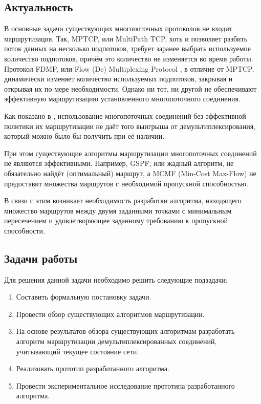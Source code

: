 \documentclass[a4paper]{article}
\begin{document}
\subsection{Актуальность}
В основные задачи существующих многопоточных протоколов не входит маршрутизация. Так, MPTCP, или MultiPath TCP, хоть и позволяет разбить поток данных на несколько подпотоков, требует заранее выбрать используемое количество подпотоков, причём это количество не изменяется во время работы. Протокол FDMP, или Flow (De) Multiplexing Protocol \cite{FDMP}, в отличие от MPTCP, динамически изменяет количество используемых подпотоков, закрывая и открывая их по мере необходимости. Однако ни тот, ни другой не обеспечивают эффективную маршрутизацию установленного многопоточного соединения. 

Как показано в \cite{stepsmel}, использование многопоточных соединений без эффективной политики их маршрутизации не даёт того выигрыша от демультиплексирования, который можно было бы получить при её наличии. 

При этом существующие алгоритмы маршрутизации многопоточных соединений не являются эффективными. Например, GSPF, или жадный алгоритм, не обязательно найдёт (оптимальный) маршрут, а MCMF (Min-Cost Max-Flow) не предоставит множества маршрутов с необходимой пропускной способностью.

В связи с этим возникает необходимость разработки алгоритма, находящего множество маршрутов между двумя заданными точками с минимальным пересечением и удовлетворяющее заданному требованию к пропускной способности.

\subsection{Задачи работы}
Для решения данной задачи необходимо решить следующие подзадачи:
\begin{enumerate}
\item Составить формальную постановку задачи.
\item Провести обзор существующих алгоритмов маршрутизации.
\item На основе результатов обзора существующих алгоритмам разработать алгоритм маршрутизации демультиплексированных соединений, учитывающий текущее состояние сети.
\item Реализовать прототип разработанного алгоритма.
\item Провести экспериментальное исследование прототипа разработанного алгоритма.
\end{enumerate}
\end{document}
